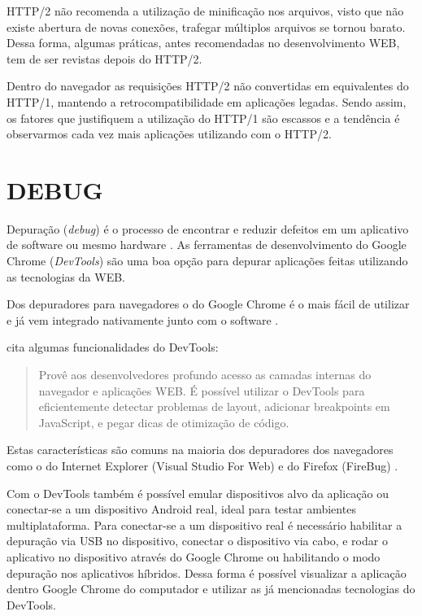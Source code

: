 HTTP/2 não recomenda a utilização de minificação nos arquivos,
visto que não existe abertura de novas conexões, trafegar múltiplos
arquivos se tornou barato. Dessa forma, algumas práticas, antes
recomendadas no desenvolvimento WEB, tem de ser revistas depois do
HTTP/2.

Dentro do navegador as requisições HTTP/2 não convertidas em
equivalentes do HTTP/1, mantendo a retrocompatibilidade em aplicações
legadas. Sendo assim, os fatores que justifiquem a utilização do HTTP/1
são escassos e a tendência é observarmos cada vez mais aplicações
utilizando com o HTTP/2.

\section{DEBUG}

Depuração (\textit{debug}) é o processo de encontrar e reduzir defeitos
em um aplicativo de software ou mesmo hardware \autocite{depuracao}.
As ferramentas de desenvolvimento do Google Chrome (\textit{DevTools})
são uma boa opção para depurar aplicações feitas utilizando as
tecnologias da WEB.

Dos depuradores para navegadores o do Google Chrome é o mais fácil
de utilizar e já vem integrado nativamente junto com o software
\autocite{gamesDebug}.

\cite{chromeDevTools} cita algumas funcionalidades do DevTools:
\begin{quote}
Provê aos desenvolvedores profundo acesso as camadas internas do
navegador e aplicações WEB. É possível utilizar o DevTools
para eficientemente detectar problemas de layout, adicionar
breakpoints em JavaScript, e pegar dicas de otimização de código.
\end{quote}

Estas características são comuns na maioria dos depuradores dos
navegadores como o do Internet Explorer (Visual Studio For Web) e do
Firefox (FireBug) \autocite{gamesDebug}.

Com o DevTools também é possível emular dispositivos alvo da
aplicação ou conectar-se a um dispositivo Android real, ideal para
testar ambientes multiplataforma. Para conectar-se a um dispositivo real
é necessário habilitar a depuração via USB no dispositivo, conectar
o dispositivo via cabo, e rodar o aplicativo no dispositivo através
do Google Chrome ou habilitando o modo depuração nos aplicativos
híbridos. Dessa forma é possível visualizar a aplicação dentro
Google Chrome do computador e utilizar as já mencionadas tecnologias do
DevTools.

